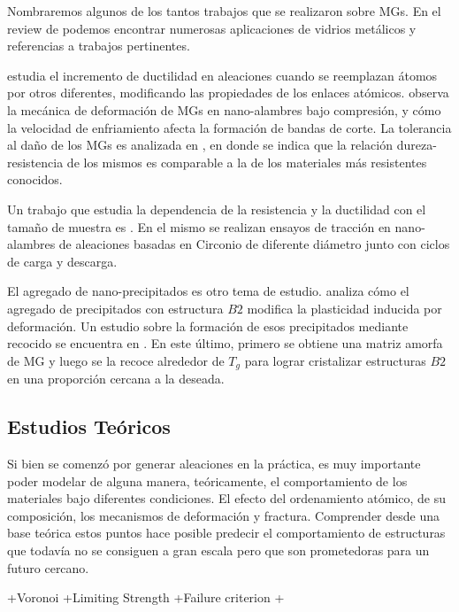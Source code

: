 Nombraremos algunos de los tantos trabajos que se realizaron sobre MGs. En el review de \cite{Axinte11} podemos encontrar numerosas aplicaciones de vidrios metálicos y referencias a trabajos pertinentes.

\cite{Zheng12} estudia el incremento de ductilidad en aleaciones cuando se reemplazan átomos por otros diferentes, modificando las propiedades de los enlaces atómicos. \cite{xiao12} observa la mecánica de deformación de MGs en nano-alambres bajo compresión, y cómo la velocidad de enfriamiento afecta la formación de bandas de corte. La tolerancia al daño de los MGs es analizada en \citep{Demetriou11}, en donde se indica que la relación dureza-resistencia de los mismos es comparable a la de los materiales más resistentes conocidos.

Un trabajo que estudia la dependencia de la resistencia y la ductilidad con el tamaño de muestra es \citep{Dongchan10}. En el mismo se realizan ensayos de tracción en nano-alambres de aleaciones basadas en Circonio de diferente diámetro junto con ciclos de carga y descarga.

El agregado de nano-precipitados es otro tema de estudio. \cite{kuo14} analiza cómo el agregado de precipitados con estructura $B2$ modifica la plasticidad inducida por deformación. Un estudio sobre la formación de esos precipitados mediante recocido se encuentra en \citep{wei14}. En este último, primero se obtiene una matriz amorfa de MG y luego se la recoce alrededor de $T_{g}$ para lograr cristalizar estructuras $B2$ en una proporción cercana a la deseada.


\subsection{Estudios Teóricos}
\label{S1_2_2}

Si bien se comenzó por generar aleaciones en la práctica, es muy importante poder modelar de alguna manera, teóricamente, el comportamiento de los materiales bajo diferentes condiciones. El efecto del ordenamiento atómico, de su composición, los mecanismos de deformación y fractura. Comprender desde una base teórica estos puntos hace posible predecir el comportamiento de estructuras que todavía no se consiguen a gran escala pero que son prometedoras para un futuro cercano.

+Voronoi
+Limiting Strength
+Failure criterion
+

